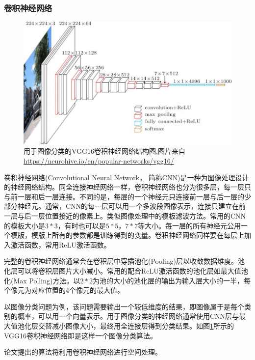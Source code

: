 \subsubsection{卷积神经网络}  \label{section:cnn}
\par
\begin{figure}[htbp!]
    \centering
    \includegraphics[width = 1.\textwidth]{chap/img/vgg16-neural-network.jpg}
    \caption{
        用于图像分类的VGG16\supercite{simonyan2014very}卷积神经网络结构图,图片来自\url{https://neurohive.io/en/popular-networks/vgg16/}
        }\label{fig:vgg16_architecture}
\end{figure}
\par
卷积神经网络(Convolutional Neural Network， 简称CNN)是一种为图像处理设计的神经网络结构。同全连接神经网络一样，卷积神经网络也分为很多层，每一层只与前一层和后一层连接。不同的是，每层的一个神经元只连接前一层与后一层的少部分神经元。通常，CNN的每一层可以用一个多波段图像表示，连接只建立在前一层与后一层位置接近的像素上。类似图像处理中的模板滤波方法。常用的CNN的模板大小是$3*3$，有时也可以是$5*5$，$7*7$等大小。每一层的所有神经元公用一个模版，模版上所有的参数都是训练得到的变量。卷积神经网络同样要在每层上加入激活函数，常用ReLU激活函数。
\par
完整的卷积神经网络通常会在卷积层中穿插池化(Pooling)层以收敛数据维度。池化层可以将卷积层图片大小减小。常用的配合ReLU激活函数的池化层如最大值池化(Max Polling)方法。以$2*2$为池的大小的池化层的输出为输入层大小的一半，每个像元为对应位置的4个像元的最大值。
\par
以图像分类问题为例，该问题需要输出一个较低维度的结果，即图像属于是每个类别的概率，可以用一个向量表示。用于图像分类的神经网络通常使用CNN层与最大值池化层交替减小图像大小，最终用全连接层得到分类结果。如图\ref{fig:vgg16_architecture}所示的VGG16\supercite{simonyan2014very}卷积神经网络即是这样一个图像分类算法。
\par
论文提出的算法将利用卷积神经网络进行空间处理。
\par

